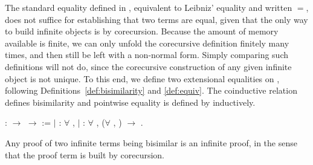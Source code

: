 The standard equality defined in \Coq, equivalent to Leibniz' equality and
written $=$, does not suffice
for establishing that two terms are equal, given that the only way to build
infinite objects is by corecursion. Because the amount of memory available is
finite, we can only unfold the corecursive definition finitely many times, and
then still be left with a non-normal form. Simply comparing such
definitions will not do, since the corecursive construction of any given
infinite object is not unique. To this end, we define two extensional
equalities on , following
Definitions~\ref{def:bisimilarity} and \ref{def:equiv}. The coinductive
relation  defines bisimilarity and
pointwise equality is defined by 
inductively.
\begin{singlespace}
\begin{coqdoccode}
\coqdocnoindent
{}
 :
 \ensuremath{\rightarrow}
 \ensuremath{\rightarrow}
 :=\coqdoceol
\coqdocindent{1.00em}
\ensuremath{|}
 :
\ensuremath{\forall} ,
 
 \coqdoceol
\coqdocindent{1.00em}
\ensuremath{|}
 :
\ensuremath{\forall}   ,
(\ensuremath{\forall} ,
 
 )
\ensuremath{\rightarrow}
 
 
.\coqdoceol
\end{coqdoccode}
\end{singlespace}
Any proof of two infinite terms being bisimilar is an infinite proof, in the
sense that the proof term is built by corecursion.
